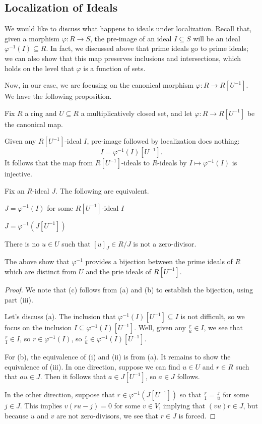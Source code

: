 \subsection{Localization of Ideals}
We would like to discuss what happens to ideals under localization. Recall that, given a morphism $\varphi:R\to S$, the pre-image of an ideal $I\subseteq S$ will be an ideal $\varphi^{-1}(I)\subseteq R$. In fact, we discussed above that prime ideals go to prime ideals; we can also show that this map preserves inclusions and intersections, which holds on the level that $\varphi$ is a function of sets.

Now, in our case, we are focusing on the canonical morphism $\varphi:R\to R\left[U^{-1}\right]$. We have the following proposition.
\begin{proposition}
	Fix $R$ a ring and $U\subseteq R$ a multiplicatively closed set, and let $\varphi:R\to R\left[U^{-1}\right]$ be the canonical map.
	\begin{listalph}
		\item Given any $R\left[U^{-1}\right]$-ideal $I$, pre-image followed by localization does nothing:
		\[I=\varphi^{-1}(I)\left[U^{-1}\right].\]
		It follows that the map from $R\left[U^{-1}\right]$-ideals to $R$-ideals by $I\mapsto\varphi^{-1}(I)$ is injective.
		\item Fix an $R$-ideal $J$. The following are equivalent.
		\begin{listroman}
			\item $J=\varphi^{-1}(I)$ for some $R\left[U^{-1}\right]$-ideal $I$
			\item $J=\varphi^{-1}\left(J\left[U^{-1}\right]\right)$
			\item There is no $u\in U$ such that $[u]_J\in R/J$ is not a zero-divisor.
		\end{listroman}
		\item The above show that $\varphi^{-1}$ provides a bijection between the prime ideals of $R$ which are distinct from $U$ and the prie ideals of $R\left[U^{-1}\right]$.
	\end{listalph}
\end{proposition}
\begin{proof}
	We note that (c) follows from (a) and (b) to establish the bijection, using part (iii).

	Let's discuss (a). The inclusion that $\varphi^{-1}(I)\left[U^{-1}\right]\subseteq I$ is not difficult, so we focus on the inclusion $I\subseteq\varphi^{-1}(I)\left[U^{-1}\right]$. Well, given any $\frac ru\in I$, we see that $\frac r1\in I$, so $r\in\varphi^{-1}(I)$, so $\frac ru\in\varphi^{-1}(I)\left[U^{-1}\right]$.

	For (b), the equivalence of (i) and (ii) is from (a). It remains to show the equivalence of (iii). In one direction, suppose we can find $u\in U$ and $r\in R$ such that $au\in J$. Then it follows that $a\in J\left[U^{-1}\right]$, so $a\in J$ follows.

	In the other direction, suppose that $r\in\varphi^{-1}(J\left[U^{-1}\right])$ so that $\frac r1=\frac ju$ for some $j\in J$. This implies $v(ru-j)=0$ for some $v\in V$, implying that $(vu)r\in J$, but because $u$ and $v$ are not zero-divisors, we see that $r\in J$ is forced.
\end{proof}

